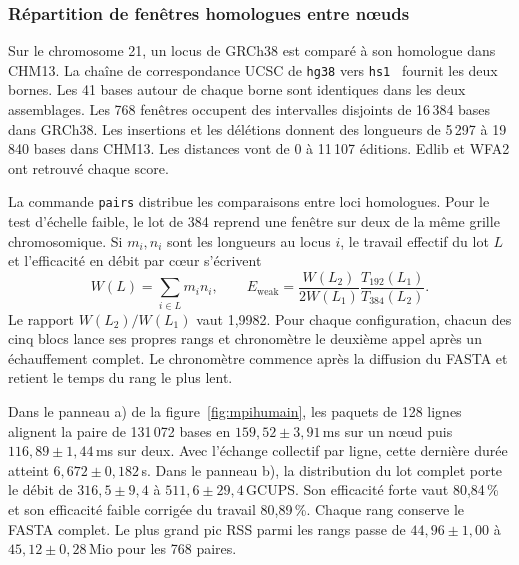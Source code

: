 \subsubsection{Répartition de fenêtres homologues entre nœuds}\label{sec:mpihumain}
Sur le chromosome 21, un locus de GRCh38 est comparé à son homologue dans CHM13. La chaîne de correspondance UCSC de \texttt{hg38} vers \texttt{hs1}~\cite{ucscchain} fournit les deux bornes. Les 41 bases autour de chaque borne sont identiques dans les deux assemblages. Les 768 fenêtres occupent des intervalles disjoints de 16\,384 bases dans GRCh38. Les insertions et les délétions donnent des longueurs de 5\,297 à 19\,840 bases dans CHM13. Les distances vont de 0 à 11\,107 éditions. Edlib et WFA2 ont retrouvé chaque score.

La commande \texttt{pairs} distribue les comparaisons entre loci homologues. Pour le test d'échelle faible, le lot de 384 reprend une fenêtre sur deux de la même grille chromosomique. Si \(m_i,n_i\) sont les longueurs au locus \(i\), le travail effectif du lot \(L\) et l'efficacité en débit par cœur s'écrivent
\[
 W(L)=\sum_{i\in L}m_i n_i,\qquad
 E_{\mathrm{weak}}=\frac{W(L_2)}{2W(L_1)}\frac{T_{192}(L_1)}{T_{384}(L_2)}.
\]
Le rapport \(W(L_2)/W(L_1)\) vaut 1,9982. Pour chaque configuration, chacun des cinq blocs lance ses propres rangs et chronomètre le deuxième appel après un échauffement complet. Le chronomètre commence après la diffusion du FASTA et retient le temps du rang le plus lent.

Dans le panneau a) de la figure~\ref{fig:mpihumain}, les paquets de 128 lignes alignent la paire de 131\,072 bases en \(159{,}52\pm3{,}91\)\,ms sur un nœud puis \(116{,}89\pm1{,}44\)\,ms sur deux. Avec l'échange collectif par ligne, cette dernière durée atteint \(6{,}672\pm0{,}182\)\,s. Dans le panneau b), la distribution du lot complet porte le débit de \(316{,}5\pm9{,}4\) à \(511{,}6\pm29{,}4\)\,GCUPS. Son efficacité forte vaut 80,84\,\% et son efficacité faible corrigée du travail 80,89\,\%. Chaque rang conserve le FASTA complet. Le plus grand pic RSS parmi les rangs passe de \(44{,}96\pm1{,}00\) à \(45{,}12\pm0{,}28\)\,Mio pour les 768 paires.

